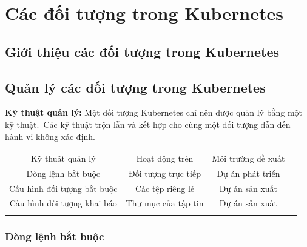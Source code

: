 \documentclass[12pt,a4paper]{report}
\begin{document}
	\section{Các đối tượng trong Kubernetes}
	\smallskip
	\subsection{Giới thiệu các đối tượng trong Kubernetes}
	\smallskip
	
	\subsection{Quản lý các đối tượng trong Kubernetes}
	\smallskip
	
	\textbf{Kỹ thuật quản lý:} 
	Một đối tượng Kubernetes chỉ nên được quản lý bằng một kỹ thuật. Các kỹ thuật trộn lẫn và kết hợp cho cùng một đối tượng dẫn đến hành vi không xác định.
	
	\begin{table}
		\centering
		\begin{tabular}{|c|c|c|l} 
			\hhline{|---~}
			{\cellcolor[rgb]{0.753,0.753,0.753}}Kỹ thuât quản lý            & {\cellcolor[rgb]{0.753,0.753,0.753}}Hoạt động trên & {\cellcolor[rgb]{0.753,0.753,0.753}}Môi trường đề xuất &   \\ 
			\hhline{|---~}
			{\cellcolor[rgb]{0.937,0.937,0.937}}Dòng lệnh bắt buộc          & Đối tượng trực tiếp                                & Dự án phát triển                                       &   \\ 
			\hhline{|---~}
			{\cellcolor[rgb]{0.937,0.937,0.937}}Cấu hình đối tượng bắt buộc & Các tệp riêng lẻ                                   & Dự án sản xuất                                         &   \\ 
			\hhline{|---~}
			{\cellcolor[rgb]{0.937,0.937,0.937}}Cấu hình đối tượng khai báo & Thư mục của tập tin                                & Dự án sản xuất                                         &   \\
			\hhline{|---~}
		\end{tabular}
	\end{table}
	
	\subsubsection{Dòng lệnh bắt buộc}
	\smallskip
	
\end{document}
